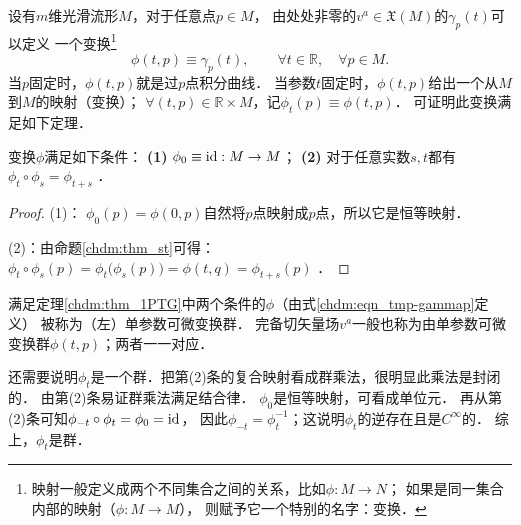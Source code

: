 设有$m$维光滑流形$M$，对于任意点$p \in M$，
由处处非零的$v^a\in \mathfrak{X}(M)$的$\gamma_p(t)$可以定义
一个变换{\footnote{映射一般定义成两个不同集合之间的关系，比如$\phi:M\to N$；
        如果是同一集合内部的映射（$\phi:M\to M$），
        则赋予它一个特别的名字：{\heiti 变换}．}}
\begin{equation}\label{chdm:eqn_tmp-gammap}
    \phi(t,p)\equiv \gamma_p(t), \qquad \forall t\in \mathbb{R},\quad \forall p\in M .
\end{equation}
当$p$固定时，$\phi(t,p)$就是过$p$点积分曲线．
当参数$t$固定时，$\phi(t,p)$给出一个从$M$到$M$的映射（变换）；
$\forall(t,p )\in\mathbb{R}\times M$，记$\phi_t(p)\equiv \phi(t,p)$．
可证明此变换满足如下定理．

\begin{theorem}\label{chdm:thm_1PTG}    
    变换$\phi$满足如下条件：    
    {\bfseries (1)} $\phi_0\equiv {\rm id} : M\to M$；    
    {\bfseries (2)} 对于任意实数$s,t$都有$\phi_t\circ \phi_s = \phi_{t+s}$ ．    
\end{theorem}
\begin{proof}
    (1)： $\phi_0(p)=\phi(0,p)$自然将$p$点映射成$p$点，所以它是恒等映射．
    
    (2)：由命题\ref{chdm:thm_st}可得：
    $\phi_t\circ \phi_s(p)=\phi_t\bigl(\phi_s(p)\bigr) =\phi(t,q)= \phi_{t+s}(p)$ ．
\end{proof}    
满足定理\ref{chdm:thm_1PTG}中两个条件的$\phi$（由式\eqref{chdm:eqn_tmp-gammap}定义）
被称为{\heiti （左）单参数可微变换群}．
完备切矢量场$v^a$一般也称为由单参数可微变换群$\phi(t,p)$；两者一一对应．

还需要说明$\phi_t$是一个群．把第(2)条的复合映射看成群乘法，很明显此乘法是封闭的．
由第(2)条易证群乘法满足结合律．
$\phi_0$是恒等映射，可看成单位元．
再从第(2)条可知$\phi_{-t}\circ \phi_t=\phi_0={\rm id}$，
因此$\phi_{-t} = \phi_t^{-1}$；这说明$\phi_t$的逆存在且是$C^\infty$的．
综上，$\phi_t$是群．




